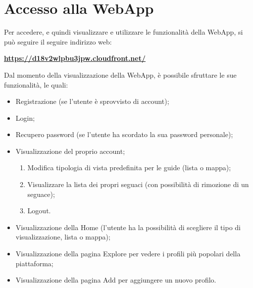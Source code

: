 \section{Accesso alla WebApp} {
    Per accedere, e quindi visualizzare e utilizzare le funzionalità della WebApp, si può seguire il seguire indirizzo web:
    
    \begin{center}
        \href{https://d18v2wlpbu3jpw.cloudfront.net/}\textbf{https://d18v2wlpbu3jpw.cloudfront.net/}
    \end{center}



    Dal momento della visualizzazione della WebApp, è possibile sfruttare le sue funzionalità, le quali:
    \begin{itemize}
        \item Registrazione (se l'utente è sprovvisto di account);
        \item Login;
        \item Recupero password (se l'utente ha scordato la sua password personale);
        \item Visualizzazione del proprio account;
        \begin{enumerate}
            \item Modifica tipologia di vista predefinita per le guide (lista o mappa);
            \item Visualizzare la lista dei propri seguaci (con possibilità di rimozione di un seguace);
            \item Logout.
        \end{enumerate}
        \item Visualizzazione della Home (l'utente ha la possibilità di scegliere il tipo di visualizzazione, lista o mappa);
        \item Visualizzazione della pagina Explore per vedere i profili più popolari della piattaforma;
        \item Visualizzazione della pagina Add per aggiungere un nuovo profilo.
  
    \end{itemize}

}
